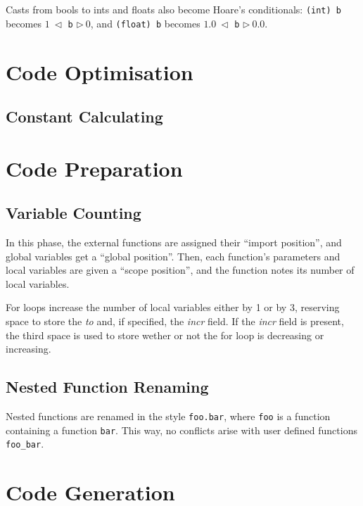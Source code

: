 \documentclass[a4paper,11pt]{report}
\begin{document}
Casts from bools to ints and floats also become Hoare's conditionals: \texttt{(int) b} becomes $1~\triangleleft$ \texttt{b} $\triangleright~0$, and \texttt{(float) b} becomes $1.0~\triangleleft$ \texttt{b} $\triangleright~0.0$.

\section{Code Optimisation}
\subsection{Constant Calculating}

\section{Code Preparation}
\subsection{Variable Counting}
In this phase, the external functions are assigned their ``import position'', and global variables get a ``global position''. Then, each function's parameters and local variables are given a ``scope position'', and the function notes its number of local variables. 

For loops increase the number of local variables either by 1 or by 3, reserving space to store the \emph{to} and, if specified, the \emph{incr} field. If the \emph{incr} field is present, the third space is used to store wether or not the for loop is decreasing or increasing.
\subsection{Nested Function Renaming}
Nested functions are renamed in the style \texttt{foo.bar}, where \texttt{foo} is a function containing a function \texttt{bar}. This way, no conflicts arise with user defined functions \texttt{foo\_bar}.

\section{Code Generation}
\end{document}
